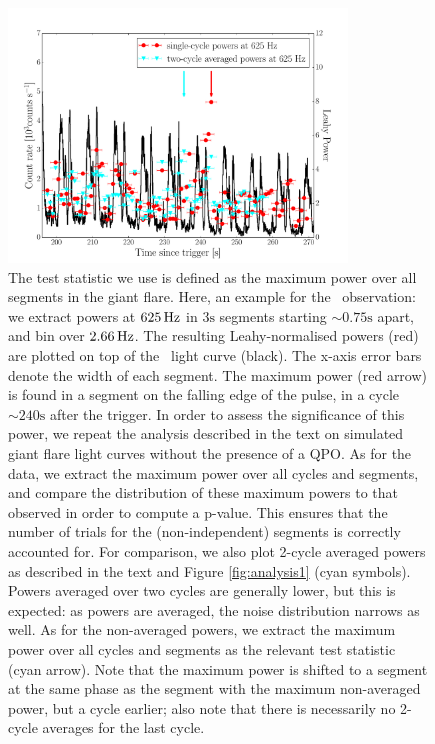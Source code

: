 \documentclass{emulateapj}
\begin{document}
\begin{figure}[h!tbp]
\begin{center}
\includegraphics[width=9cm]{f2.pdf}
\caption{The test statistic we use is defined as the maximum power over all segments in the giant flare. Here, an example for the \rxte\ observation: we extract powers at $625 \,\mathrm{Hz}$ in $3\mathrm{s}$ segments starting $\sim 0.75 \mathrm{s}$ apart, and bin over $2.66 \,\mathrm{Hz}$. The resulting Leahy-normalised powers (red) are plotted on top of the \rxte\ light curve (black). The x-axis error bars denote the width of each segment. The maximum power (red arrow) is found in a segment on the falling edge of the pulse, in a cycle $\sim 240 \mathrm{s}$ after the trigger. In order to assess the significance of this power, we repeat the analysis described in the text on simulated giant flare light curves without the presence of a QPO. As for the data, we extract the maximum power over all cycles and segments, and compare the distribution of these maximum powers to that observed in order to compute a p-value. This ensures that the number of trials for the (non-independent) segments is correctly accounted for. For comparison, we also plot 2-cycle averaged powers as described in the text and Figure \ref{fig:analysis1} (cyan symbols). Powers averaged over two cycles are generally lower, but this is expected: as powers are averaged, the noise distribution narrows as well. As for the non-averaged powers, we extract the maximum power over all cycles and segments as the relevant test statistic (cyan arrow). Note that the maximum power is shifted to a segment at the same phase as the segment with the maximum non-averaged power, but a cycle earlier; also note that there is necessarily no 2-cycle averages for the last cycle. }
\label{fig:teststatistic}
\end{center}
\end{figure}
\end{document}
